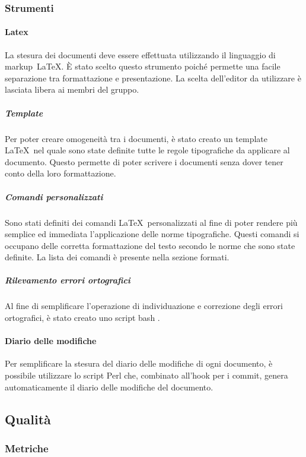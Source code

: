 \documentclass[../NormeProgetto.text]{subfiles}
\begin{document}
		\subsubsection{Strumenti}
			\paragraph{Latex}
				La stesura dei documenti deve essere effettuata utilizzando il linguaggio di markup\g\ \LaTeX\g. È stato scelto questo strumento poiché permette una facile separazione tra formattazione e presentazione. La scelta dell'editor da utilizzare è lasciata libera ai membri del gruppo.
				\subparagraph{Template}
					Per poter creare omogeneità tra i documenti, è stato creato un template \LaTeX\g\ nel quale sono state definite tutte le regole tipografiche da applicare al documento. Questo permette di poter scrivere i documenti senza dover tener conto della loro formattazione.
				\subparagraph{Comandi personalizzati}
					Sono stati definiti dei comandi \LaTeX\g\ personalizzati al fine di poter rendere più semplice ed immediata l'applicazione delle norme tipografiche. Questi comandi si occupano delle corretta formattazione del testo secondo le norme che sono state definite. La lista dei comandi è presente nella sezione formati.
				\subparagraph{Rilevamento errori ortografici}
					Al fine di semplificare l'operazione di individuazione e correzione degli errori ortografici, è stato creato uno script bash .
			\paragraph{Diario delle modifiche}
				Per semplificare la stesura del diario delle modifiche di ogni documento, è possibile utilizzare lo script Perl  che, combinato all'hook per i commit, genera automaticamente il diario delle modifiche del documento.
					
\subsection{Qualità}
	\subsubsection{Metriche}
\end{document}
